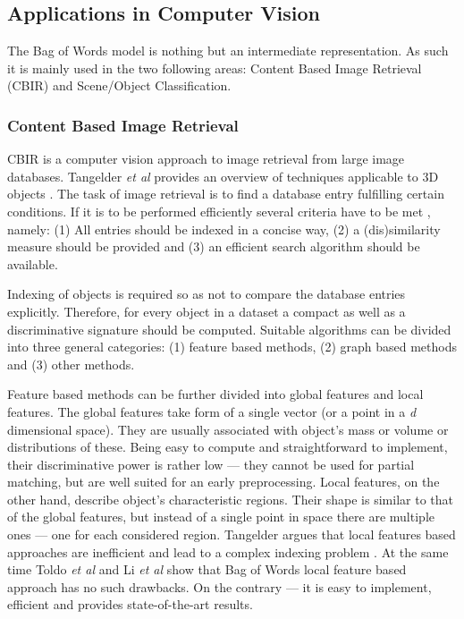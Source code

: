 	\subsection{Applications in Computer Vision}
	The Bag of Words model is nothing but an intermediate representation. As such it is mainly used in the two following areas: Content Based Image Retrieval (CBIR) and Scene/Object Classification.
	
		\subsubsection{Content Based Image Retrieval}
		CBIR is a computer vision approach to image retrieval from large image databases. Tangelder \emph{et al} provides an overview of techniques applicable to 3D objects \cite{tangelder2008survey}. The task of image retrieval is to find a database entry fulfilling certain conditions. If it is to be performed efficiently several criteria have to be met \cite{toldo2009bag}, namely: (1) All entries should be indexed in a concise way, (2) a (dis)similarity measure should be provided and (3) an efficient search algorithm should be available. 
		
		Indexing of objects is required so as not to compare the database entries explicitly. Therefore, for every object in a dataset a compact as well as a discriminative signature should be computed. Suitable algorithms can be divided into three general categories: (1) feature based methods, (2) graph based methods and (3) other methods.

		Feature based methods can be further divided into global features and local features. The global features take form of a single vector (or a point in a \emph{d} dimensional space). They are usually associated with object's mass or volume or distributions of these. Being easy to compute and straightforward to implement, their discriminative power is rather low --- they cannot be used for partial matching, but are well suited for an early preprocessing. Local features, on the other hand, describe object's characteristic regions. Their shape is similar to that of the global features, but instead of a single point in space there are multiple ones --- one for each considered region. Tangelder argues that local features based approaches are inefficient and lead to a complex indexing problem \cite{tangelder2008survey}. At the same time Toldo \emph{et al} and Li \emph{et al} show that Bag of Words local feature based approach has no such drawbacks. On the contrary --- it is easy to implement, efficient and provides state-of-the-art results.
		

